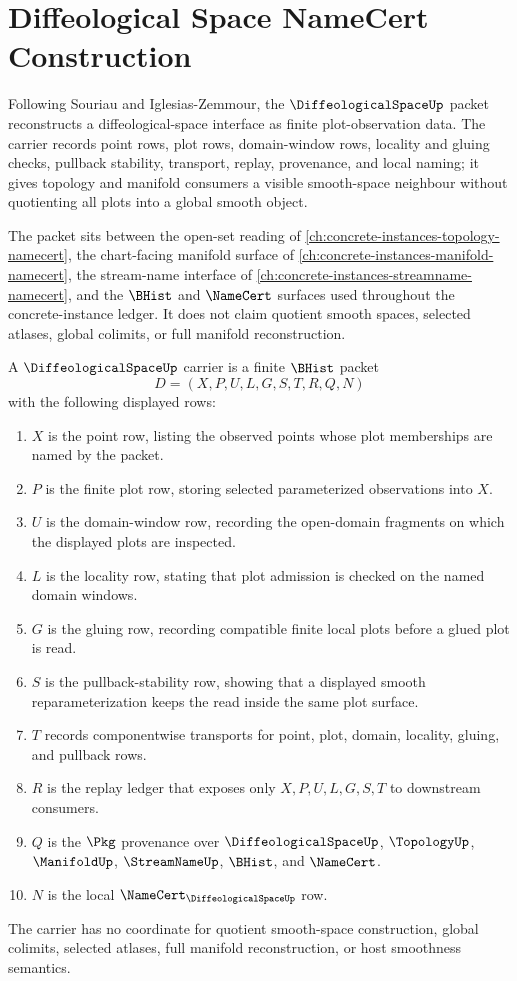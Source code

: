 \chapter{Diffeological Space NameCert Construction}
\label{ch:concrete-instances-diffeological-space-namecert}

Following Souriau and Iglesias-Zemmour, the $\DiffeologicalSpaceUp$ packet reconstructs a diffeological-space interface as finite plot-observation data. The carrier records point rows, plot rows, domain-window rows, locality and gluing checks, pullback stability, transport, replay, provenance, and local naming; it gives topology and manifold consumers a visible smooth-space neighbour without quotienting all plots into a global smooth object.

The packet sits between the open-set reading of \autoref{ch:concrete-instances-topology-namecert}, the chart-facing manifold surface of \autoref{ch:concrete-instances-manifold-namecert}, the stream-name interface of \autoref{ch:concrete-instances-streamname-namecert}, and the $\BHist$ and $\NameCert$ surfaces used throughout the concrete-instance ledger. It does not claim quotient smooth spaces, selected atlases, global colimits, or full manifold reconstruction.

\begin{definition}
\label{def:diffeological-space-carrier}
A $\DiffeologicalSpaceUp$ carrier is a finite $\BHist$ packet
$$
D=(X,P,U,L,G,S,T,R,Q,N)
$$
with the following displayed rows:
\begin{enumerate}
\item $X$ is the point row, listing the observed points whose plot memberships are named by the packet.
\item $P$ is the finite plot row, storing selected parameterized observations into $X$.
\item $U$ is the domain-window row, recording the open-domain fragments on which the displayed plots are inspected.
\item $L$ is the locality row, stating that plot admission is checked on the named domain windows.
\item $G$ is the gluing row, recording compatible finite local plots before a glued plot is read.
\item $S$ is the pullback-stability row, showing that a displayed smooth reparameterization keeps the read inside the same plot surface.
\item $T$ records componentwise transports for point, plot, domain, locality, gluing, and pullback rows.
\item $R$ is the replay ledger that exposes only $X,P,U,L,G,S,T$ to downstream consumers.
\item $Q$ is the $\Pkg$ provenance over $\DiffeologicalSpaceUp$, $\TopologyUp$, $\ManifoldUp$, $\StreamNameUp$, $\BHist$, and $\NameCert$.
\item $N$ is the local $\NameCert_{\DiffeologicalSpaceUp}$ row.
\end{enumerate}
The carrier has no coordinate for quotient smooth-space construction, global colimits, selected atlases, full manifold reconstruction, or host smoothness semantics.
\end{definition}

